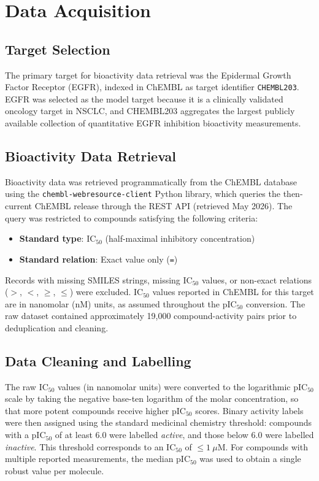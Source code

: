 \section{Data Acquisition}

\subsection{Target Selection}

The primary target for bioactivity data retrieval was the Epidermal Growth Factor
Receptor (EGFR), indexed in ChEMBL as target identifier \texttt{CHEMBL203}. EGFR
was selected as the model target because it is a clinically validated oncology
target in NSCLC, and CHEMBL203 aggregates the largest publicly available collection
of quantitative EGFR inhibition bioactivity measurements.

\subsection{Bioactivity Data Retrieval}

Bioactivity data was retrieved programmatically from the ChEMBL database using the
\texttt{chembl-webresource-client} Python library, which queries the then-current
ChEMBL release through the REST API (retrieved May 2026). The query was
restricted to compounds satisfying the following criteria:
\begin{itemize}
    \item \textbf{Standard type}: IC$_{50}$ (half-maximal inhibitory concentration)
    \item \textbf{Standard relation}: Exact value only (\texttt{=})
\end{itemize}

Records with missing SMILES strings, missing IC$_{50}$ values, or non-exact
relations ($>$, $<$, $\geq$, $\leq$) were excluded. IC$_{50}$ values reported
in ChEMBL for this target are in nanomolar (nM) units, as assumed throughout
the pIC$_{50}$ conversion. The raw dataset contained
approximately 19,000 compound-activity pairs prior to deduplication and cleaning.

\subsection{Data Cleaning and Labelling}

The raw IC$_{50}$ values (in nanomolar units) were converted to the logarithmic
pIC$_{50}$ scale by taking the negative base-ten logarithm of the molar
concentration, so that more potent compounds receive higher pIC$_{50}$ scores.
Binary activity labels were then assigned using the standard medicinal chemistry
threshold: compounds with a pIC$_{50}$ of at least 6.0 were labelled \textit{active},
and those below 6.0 were labelled \textit{inactive}. This threshold corresponds to
an IC$_{50}$ of $\leq 1~\mu$M. For compounds with multiple reported measurements,
the median pIC$_{50}$ was used to obtain a single robust value per molecule.

